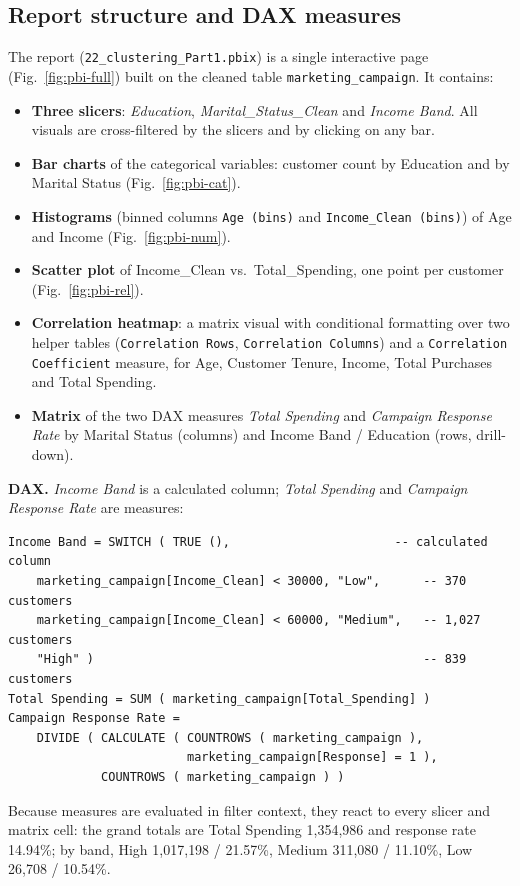 \documentclass[11pt]{article}
\begin{document}
\subsection{Report structure and DAX measures}
The report (\texttt{22\_clustering\_Part1.pbix}) is a single interactive page
(Fig.~\ref{fig:pbi-full}) built on the cleaned table \texttt{marketing\_campaign}. It contains:
\begin{itemize}
\item \textbf{Three slicers}: \emph{Education}, \emph{Marital\_Status\_Clean} and \emph{Income Band}.
All visuals are cross-filtered by the slicers and by clicking on any bar.
\item \textbf{Bar charts} of the categorical variables: customer count by Education and by
Marital Status (Fig.~\ref{fig:pbi-cat}).
\item \textbf{Histograms} (binned columns \texttt{Age (bins)} and \texttt{Income\_Clean (bins)}) of
Age and Income (Fig.~\ref{fig:pbi-num}).
\item \textbf{Scatter plot} of Income\_Clean vs.\ Total\_Spending, one point per customer
(Fig.~\ref{fig:pbi-rel}).
\item \textbf{Correlation heatmap}: a matrix visual with conditional formatting over two helper
tables (\texttt{Correlation Rows}, \texttt{Correlation Columns}) and a \texttt{Correlation
Coefficient} measure, for Age, Customer Tenure, Income, Total Purchases and Total Spending.
\item \textbf{Matrix} of the two DAX measures \emph{Total Spending} and \emph{Campaign Response Rate}
by Marital Status (columns) and Income Band / Education (rows, drill-down).
\end{itemize}
\textbf{DAX.} \emph{Income Band} is a calculated column; \emph{Total Spending} and \emph{Campaign
Response Rate} are measures:
\begin{lstlisting}
Income Band = SWITCH ( TRUE (),                       -- calculated column
    marketing_campaign[Income_Clean] < 30000, "Low",      -- 370 customers
    marketing_campaign[Income_Clean] < 60000, "Medium",   -- 1,027 customers
    "High" )                                              -- 839 customers
Total Spending = SUM ( marketing_campaign[Total_Spending] )
Campaign Response Rate =
    DIVIDE ( CALCULATE ( COUNTROWS ( marketing_campaign ),
                         marketing_campaign[Response] = 1 ),
             COUNTROWS ( marketing_campaign ) )
\end{lstlisting}
Because measures are evaluated in filter context, they react to every slicer and matrix cell: the
grand totals are Total Spending 1{,}354{,}986 and response rate 14.94\%; by band, High
1{,}017{,}198 / 21.57\%, Medium 311{,}080 / 11.10\%, Low 26{,}708 / 10.54\%.
\end{document}
